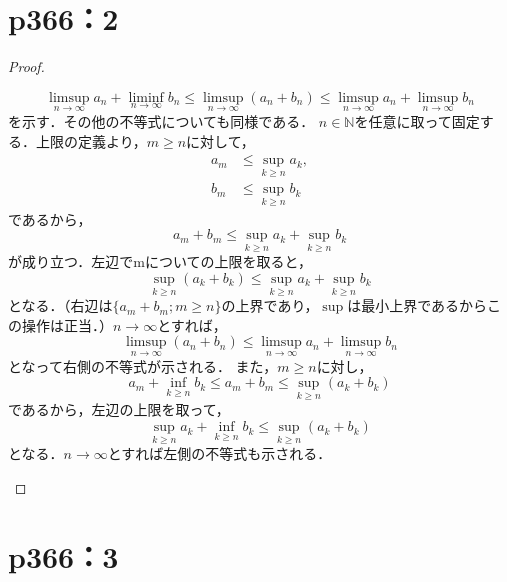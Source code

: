 \documentclass[a4paper,10pt,fleqn]{ltjsarticle}
\begin{document}
\section*{p366：2}

\begin{proof}
    \begin{leftbar}
        \[
            \limsup _{n \to \infty} a_n + \liminf _{n \to \infty} b_n \leq \limsup _{n \to \infty} (a_n + b_n) \leq \limsup _{n \to \infty} a_n + \limsup _{n \to \infty} b_n
        \]
        を示す．その他の不等式についても同様である．
        $n \in \mathbb{N}$を任意に取って固定する．上限の定義より，$m \geq n$に対して，
        \begin{align*}
            a_m & \leq \sup _{k \geq n} a_k, \\
            b_m & \leq \sup _{k \geq n} b_k
        \end{align*}
        であるから，
        \[
            a_m + b_m \leq \sup _{k \geq n} a_k + \sup _{k \geq n} b_k
        \]
        が成り立つ．左辺でmについての上限を取ると，
        \[
            \sup _{k \geq n} (a_k + b_k) \leq \sup _{k \geq n} a_k + \sup _{k \geq n} b_k
        \]
        となる．（右辺は$\{a_m + b_m; m \geq n\}$の上界であり，$\sup$は最小上界であるからこの操作は正当．）$n \to \infty$とすれば，
        \[
            \limsup _{n \to \infty} (a_n + b_n) \leq \limsup _{n \to \infty} a_n + \limsup _{n \to \infty} b_n
        \]
        となって右側の不等式が示される．
        また，$m \geq n$に対し，
        \[
            a_m + \inf _{k \geq n} b_k \leq a_m + b_m \leq \sup _{k \geq n} (a_k + b_k)
        \]
        であるから，左辺の上限を取って，
        \[
            \sup _{k \geq n} a_k + \inf _{k \geq n} b_k \leq \sup _{k \geq n} (a_k + b_k)
        \]
        となる．$n \to \infty$とすれば左側の不等式も示される．
    \end{leftbar}
\end{proof}

\section*{p366：3}
\end{document}
